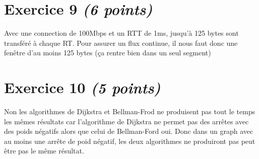 \documentclass{article}
\begin{document}
\section{Exercice 9 \emph{(6 points)}}
Avec  une connection de 100Mbps et un RTT de 1ms, jusqu'à 125 bytes sont transféré à chaque RT.
Pour assurer un flux continue, il nous faut donc une fenêtre d'au moins 125 bytes (ça rentre bien dans un seul segment)


\section{Exercice 10 \emph{(5 points)}}

Non les algorithmes de Dijkstra et Bellman-Frod ne produisent pas tout le temps les mêmes résultats car l'algorithme de Dijkstra ne permet pas des arrêtes avec des poids négatifs alors que celui de Bellman-Ford oui. Donc dans un graph avec au moins une arrête de poid négatif, les deux algorithmes ne produiront pas peut être pas le même résultat.
\end{document}
